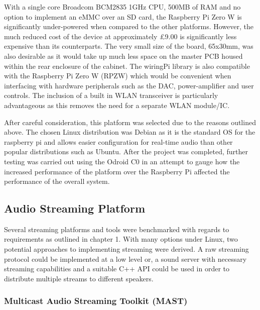 \documentclass[main.tex]{subfiles}
\begin{document}
\medskip

\medskip
With a single core Broadcom BCM2835 1GHz CPU, 500MB of RAM and no option to implement an eMMC over an SD card, the Raspberry Pi Zero W is significantly under-powered when compared to the other platforms. 
However, the much reduced cost of the device at approximately £9.00\cite{RpiPrice} is significantly less expensive than its counterparts. The very small size of the board, 65x30mm, was also desirable as it would take up much less space on the master PCB housed within the rear enclosure of the cabinet. 
The wiringPi library is also compatible with the Raspberry Pi Zero W (RPZW) which would be convenient when interfacing with hardware peripherals such as the DAC, power-amplifier and user controls. The inclusion of a built in WLAN transceiver is particularly advantageous as this removes the need for a separate WLAN module/IC. 

\medskip
After careful consideration, this platform was selected due to the reasons outlined above. 
The chosen Linux distribution was Debian as it is the standard OS for the raspberry pi and allows easier configuration for real-time audio than other popular distributions such as Ubuntu. 
After the project was completed, further testing was carried out using the Odroid C0 in an attempt to gauge how the increased performance of the platform over the Raspberry Pi affected the performance of the overall system. 

\subsection{Audio Streaming Platform}
Several streaming platforms and tools were benchmarked with regards to requirements as outlined in chapter 1. 
With many options under Linux, two potential approaches to implementing streaming were derived. 
A raw streaming protocol could be implemented at a low level or, a sound server with necessary streaming capabilities and a suitable C++ API could be used in order to distribute multiple streams to different speakers.

\medskip

\medskip

\subsubsection{Multicast Audio Streaming Toolkit (MAST)}
\end{document}
